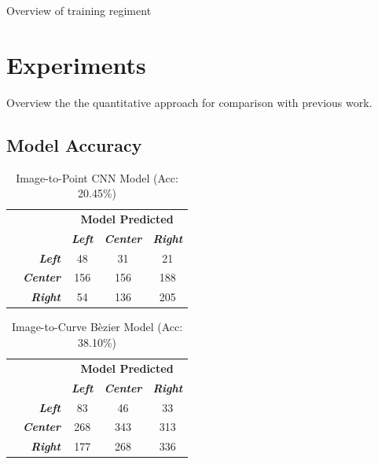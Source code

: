 \documentclass[conference]{IEEEtran}
\begin{document}
Overview of training regiment

\section{Experiments}

Overview the  the quantitative approach for comparison with previous work.

\subsection{Model Accuracy}

	\begin{table}[btp]
        \centering
            \caption{Image-to-Point CNN Model (Acc: 20.45\%)}
            \begin{tabular}{|c|r|c|c|c|}
            \multicolumn{2}{c}{} & \multicolumn{3}{c}{\bfseries Model Predicted}\\\cline{3-5}
            \multicolumn{1}{c}{} & & \textbf{\textit{Left}} & \textbf{\textit{Center}} & \textbf{\textit{Right}}\\\hline
             \parbox[t]{2mm}{} & \textbf{\textit{Left}} & 48 & 31 & 21 \\
            & \textbf{\textit{Center}} & 156 & 156 & 188 \\
            & \textbf{\textit{Right}} & 54 & 136 & 205 \\\hline
            \end{tabular}
        \label{tab:i2p-acc}
    \end{table}
    
    \begin{table}[btp]
        \centering
            \caption{Image-to-Curve B\`ezier Model (Acc: 38.10\%) }
            \begin{tabular}{|c|r|c|c|c|}
            \multicolumn{2}{c}{} & \multicolumn{3}{c}{\bfseries Model Predicted}\\\cline{3-5}
            \multicolumn{1}{c}{} & & \textbf{\textit{Left}} & \textbf{\textit{Center}} & \textbf{\textit{Right}}\\\hline
             \parbox[t]{2mm}{} & \textbf{\textit{Left}} & 83 & 46 & 33 \\
            & \textbf{\textit{Center}} & 268 & 343 & 313 \\
            & \textbf{\textit{Right}} & 177 & 268 & 336 \\\hline
            \end{tabular}
        \label{tab:i2bc-acc}
    \end{table}
\end{document}
